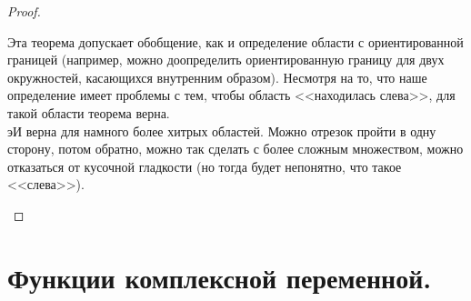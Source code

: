 \documentclass{article}
\begin{document}
\begin{proof}
\begin{figure}[H]
        \end{figure}
        \begin{remark}
            Эта теорема допускает обобщение, как и определение области с ориентированной границей (например, можно доопределить ориентированную границу для двух окружностей, касающихся внутренним образом). Несмотря на то, что наше определение имеет проблемы с тем, чтобы область <<находилась слева>>, для такой области теорема верна.\\
            эИ верна для намного более хитрых областей. Можно отрезок пройти в одну сторону, потом обратно, можно так сделать с более сложным множеством, можно отказаться от кусочной гладкости (но тогда будет непонятно, что такое <<слева>>).
        \end{remark}
    \end{proof}
    \section{Функции комплексной переменной.}
\end{document}

